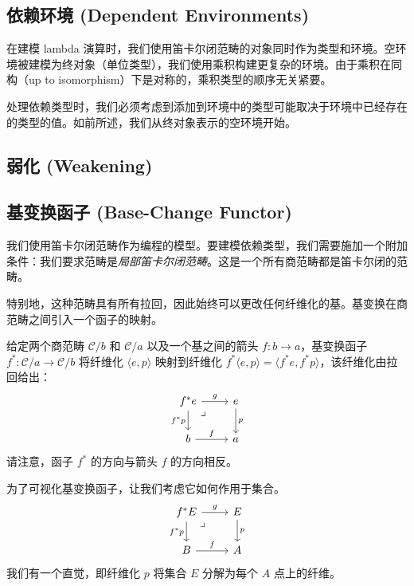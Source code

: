 \documentclass[DaoFP]{subfiles}
\begin{document}
 \subsection{依赖环境 (Dependent Environments)}
 在建模 lambda 演算时，我们使用笛卡尔闭范畴的对象同时作为类型和环境。空环境被建模为终对象（单位类型），我们使用乘积构建更复杂的环境。由于乘积在同构（up to isomorphism）下是对称的，乘积类型的顺序无关紧要。

 处理依赖类型时，我们必须考虑到添加到环境中的类型可能取决于环境中已经存在的类型的值。如前所述，我们从终对象表示的空环境开始。

 \subsection{弱化 (Weakening)}

 \subsection{基变换函子 (Base-Change Functor)}

 我们使用笛卡尔闭范畴作为编程的模型。要建模依赖类型，我们需要施加一个附加条件：我们要求范畴是\emph{局部笛卡尔闭范畴}。这是一个所有商范畴都是笛卡尔闭的范畴。

 特别地，这种范畴具有所有拉回，因此始终可以更改任何纤维化的基。基变换在商范畴之间引入一个函子的映射。

 给定两个商范畴 $\mathcal{C}/b$ 和 $\mathcal{C}/a$ 以及一个基之间的箭头 $f \colon b \to a$，基变换函子 $f^* \colon \mathcal{C}/a \to \mathcal{C}/b$ 将纤维化 $\langle e, p \rangle$ 映射到纤维化 $ f^* \langle e, p \rangle= \langle f^* e, f^* p \rangle$，该纤维化由拉回给出：
 \[
  \begin{tikzcd}
   f^* e
   \arrow[dr, phantom,  , very near start, "\lrcorner"]
   \arrow[d, "f^*p"']
   \arrow[r, "g"]
   & e
   \arrow[d, "p"]
   \\
   b
   \arrow[r, "f"]
   &a
  \end{tikzcd}
 \]
 请注意，函子 $f^*$ 的方向与箭头 $f$ 的方向相反。

 为了可视化基变换函子，让我们考虑它如何作用于集合。
 \[
  \begin{tikzcd}
   f^* E
   \arrow[dr, phantom,  , very near start, "\lrcorner"]
   \arrow[d, "f^*p"']
   \arrow[r, "g"]
   & E
   \arrow[d, "p"]
   \\
   B
   \arrow[r, "f"]
   &A
  \end{tikzcd}
 \]
 我们有一个直觉，即纤维化 $p$ 将集合 $E$ 分解为每个 $A$ 点上的纤维。
\end{document}
